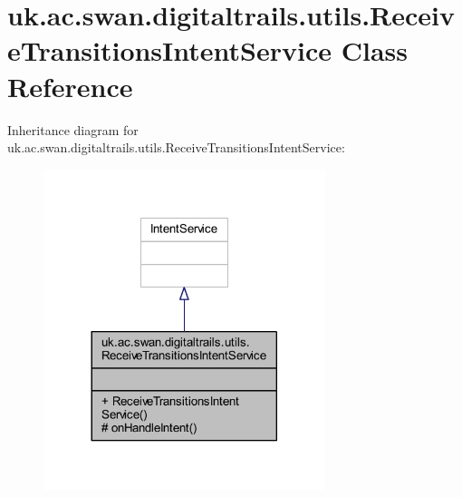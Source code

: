 \hypertarget{classuk_1_1ac_1_1swan_1_1digitaltrails_1_1utils_1_1_receive_transitions_intent_service}{\section{uk.\+ac.\+swan.\+digitaltrails.\+utils.\+Receive\+Transitions\+Intent\+Service Class Reference}
\label{classuk_1_1ac_1_1swan_1_1digitaltrails_1_1utils_1_1_receive_transitions_intent_service}
}


Inheritance diagram for uk.\+ac.\+swan.\+digitaltrails.\+utils.\+Receive\+Transitions\+Intent\+Service\+:
\nopagebreak
\begin{figure}[H]
\begin{center}
\leavevmode
\includegraphics[width=233pt]{classuk_1_1ac_1_1swan_1_1digitaltrails_1_1utils_1_1_receive_transitions_intent_service__inherit__graph}
\end{center}
\end{figure}


